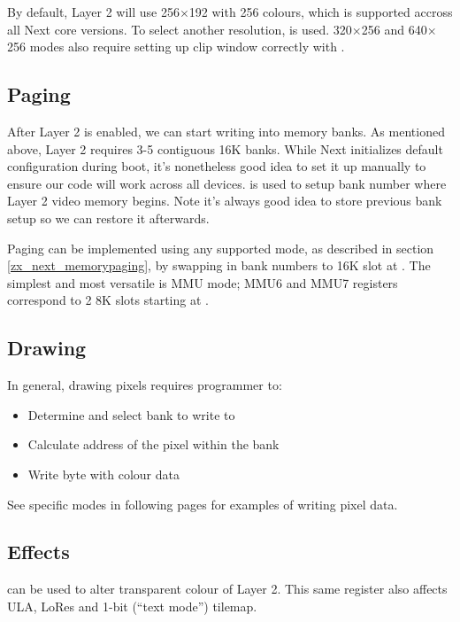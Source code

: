 By default, Layer 2 will use 256$\times$192 with 256 colours, which is supported accross all Next core versions. To select another resolution,  is used. 320$\times$256 and 640$\times$256 modes also require setting up clip window correctly with .


\subsection{Paging}

After Layer 2 is enabled, we can start writing into memory banks. As mentioned above, Layer 2 requires 3-5 contiguous 16K banks. While Next initializes default configuration during boot, it's nonetheless good idea to set it up manually to ensure our code will work across all devices.  is used to setup bank number where Layer 2 video memory begins. Note it's always good idea to store previous bank setup so we can restore it afterwards.

Paging can be implemented using any supported mode, as described in section \ref{zx_next_memorypaging}, by swapping in bank numbers to 16K slot at . The simplest and most versatile is MMU mode; MMU6 and MMU7 registers correspond to 2 8K slots starting at .

\pagebreak
\subsection{Drawing}

In general, drawing pixels requires programmer to:

\begin{itemize}[topsep=1pt,itemsep=1pt]
	\item Determine and select bank to write to
	\item Calculate address of the pixel within the bank
	\item Write byte with colour data
\end{itemize}

See specific modes in following pages for examples of writing pixel data.


\subsection{Effects}

 can be used to alter transparent colour of Layer 2. This same register also affects ULA, LoRes and 1-bit (``text mode'') tilemap.

